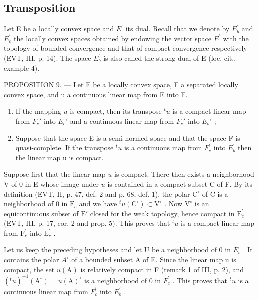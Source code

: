 \subsection{Transposition}

Let E be a locally convex space and \(E^{\prime}\) its dual. Recall that we denote by \(E_{b}^{\prime}\) and \(E_{c}^{\prime}\) the locally convex spaces obtained by endowing the vector space \(E^{\prime}\) with the topology of bounded convergence and that of compact convergence respectively (EVT, III, p. 14). The space \(E_{b}^{\prime}\) is also called the strong dual of E (loc. cit., example 4).

PROPOSITION 9. --- Let E be a locally convex space, F a separated locally convex space, and u a continuous linear map from E into F.

\begin{enumerate}
\def\labelenumi{\alph{enumi})}
\item
  If the mapping \(u\) is compact, then its transpose \(^{t}u\) is a compact linear map from \(F_c'\) into \(E_c'\) and a continuous linear map from \(F_c'\) into \(E_b'\) ;
\item
  Suppose that the space E is a semi-normed space and that the space F is quasi-complete. If the transpose \({}^{t}u\) is a continuous map from \(F_{c}^{\prime}\) into \(E_{b}^{\prime}\) then the linear map u is compact.
\end{enumerate}

Suppose first that the linear map \(u\) is compact. There then exists a neighborhood V of 0 in E whose image under \(u\) is contained in a compact subset C of F. By its definition (EVT, II, p. 47, def. 2 and p. 68, def. 1), the polar \(\mathrm{C}^{\circ}\) of C is a neighborhood of 0 in \(\mathrm{F}_c^\prime\) and we have \({}^t u(\mathrm{C}^\circ) \subset \mathrm{V}^\circ\) . Now \(\mathrm{V}^\circ\) is an equicontinuous subset of \(\mathrm{E}'\) closed for the weak topology, hence compact in \(\mathrm{E}_c^\prime\) (EVT, III, p. 17, cor. 2 and prop. 5). This proves that \({}^t u\) is a compact linear map from \(\mathrm{F}_c^\prime\) into \(\mathrm{E}_c^\prime\) .

Let us keep the preceding hypotheses and let U be a neighborhood of 0 in \(E_{b}^{\prime}\) . It contains the polar \(A^{\circ}\) of a bounded subset A of E. Since the linear map u is compact, the set \(u(\mathrm{A})\) is relatively compact in F (remark 1 of III, p. 2), and \((^{t}u)^{-1}(\mathrm{A}^{\circ}) = u(\mathrm{A})^{\circ}\) is a neighborhood of 0 in \(F_{c}^{\prime}\) . This proves that \(^{t}u\) is a continuous linear map from \(F_{c}^{\prime}\) into \(E_{b}^{\prime}\) .

